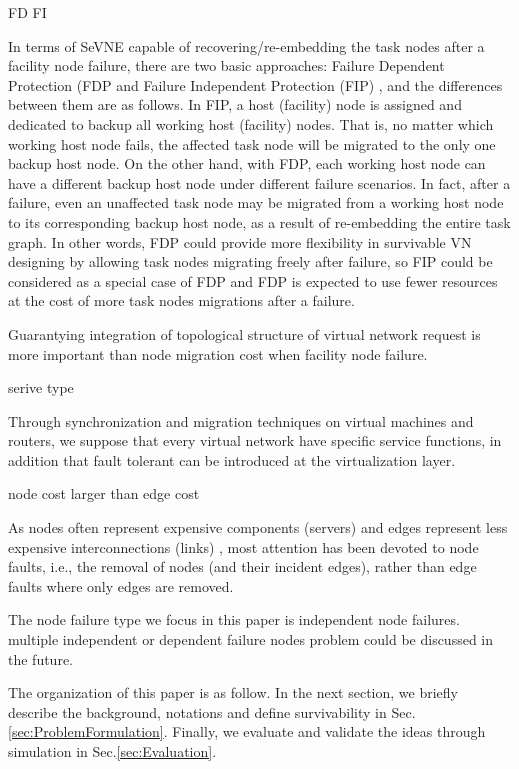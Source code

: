 FD  FI

In terms of SeVNE capable of recovering/re-embedding the task nodes after a facility node failure, there are two basic approaches: Failure Dependent Protection (FDP \cite{yu2010survivable} and Failure Independent Protection (FIP) \cite{yeow2011designing}, and the differences between them are as follows. In FIP, a host (facility) node is assigned and dedicated to backup all working host (facility) nodes. That is, no matter which working host node fails, the affected task node will be migrated to the only one backup host node. On the other hand, with FDP, each working host node can have a different backup host node under different failure scenarios. In fact, after a failure, even an unaffected task node may be migrated from a working host node to its corresponding backup host node, as a result of re-embedding the entire task graph. In other words, FDP could provide more flexibility in survivable VN designing by allowing task nodes migrating freely after failure, so FIP could be considered as a special case of FDP and FDP is expected to use fewer resources at the cost of more task nodes migrations after a failure.


Guarantying integration of topological structure of virtual network request is more important than node migration cost when facility node failure.


serive type

Through synchronization\cite{bressoud1996hypervisor,cully2008remus} and migration techniques\cite{clark2005live,wang2008virtual} on virtual machines and routers, we suppose that every virtual network have specific service functions, in addition that fault tolerant can be introduced at the virtualization layer\cite{yeow2011designing}. \cite{qu2016delay}

node cost larger than edge cost

As nodes often represent expensive components (servers) and edges represent less expensive interconnections (links) \cite{armbrust2009above,yu2010survivable}, most attention has been devoted to node faults, i.e., the removal of nodes (and their incident edges), rather than edge faults where only edges are removed.

The node failure type we focus in this paper is independent node failures. multiple independent or dependent failure nodes problem could be discussed in the future. 


%

The organization of this paper is as follow. In the next section, we briefly describe the background, notations and define survivability in Sec.\ref{sec:ProblemFormulation}. Finally, we evaluate and validate the ideas through simulation in Sec.\ref{sec:Evaluation}. 